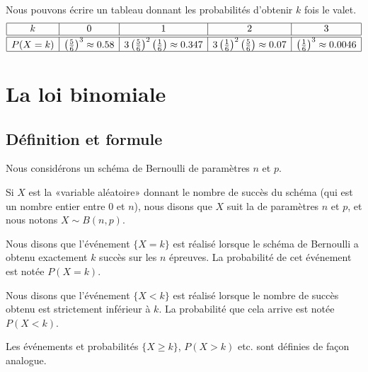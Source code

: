 \begin{example}
    Nous pouvons écrire un tableau donnant les probabilités d'obtenir \( k\) fois le valet.
    \begin{equation}
        \begin{array}[]{|c|c|c|c|c|}
            \hline
            k&0&1&2&3\\
            \hline\hline
            P(X=k)&\left( \frac{ 5 }{ 6 } \right)^3\approx 0.58& 3\left( \frac{ 5 }{ 6 } \right)^2\left( \frac{1}{ 6 } \right)\approx 0.347 &3\left( \frac{1}{ 6 } \right)^2\left( \frac{ 5 }{ 6 } \right)\approx 0.07&\left( \frac{1}{ 6 } \right)^3\approx0.0046\\
            \hline
        \end{array}
    \end{equation}

\end{example}

\section{La loi binomiale}

\subsection{Définition et formule}

Nous considérons un schéma de Bernoulli de paramètres \( n\) et \( p\).
\begin{Aretenir}
    Si \( X\) est la «variable aléatoire» donnant le nombre de succès du schéma (qui est un nombre entier entre \( 0\) et \( n\)), nous disons que \( X\) suit la  de paramètres \( n\) et \( p\), et nous notons \( X\sim B(n,p)\).

    Nous disons que l'événement \( \{ X=k \}\) est réalisé lorsque le schéma de Bernoulli a obtenu exactement \( k\) succès sur les \( n\) épreuves. La probabilité de cet événement est notée \( P(X=k)\).

    Nous disons que l'événement \( \{ X<k \}\) est réalisé lorsque le nombre de succès obtenu est strictement inférieur à \( k\). La probabilité que cela arrive est notée \( P(X<k)\).

    Les événements et probabilités \( \{ X\geq k \}\), \( P(X>k)\) etc. sont définies de façon analogue.
\end{Aretenir}


